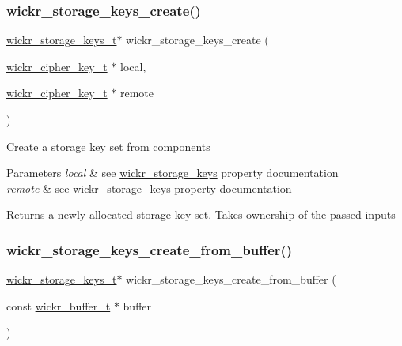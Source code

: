\subsubsection{\texorpdfstring{wickr\+\_\+storage\+\_\+keys\+\_\+create()}{wickr\_storage\_keys\_create()}}
{\footnotesize\ttfamily \hyperlink{structwickr__storage__keys}{wickr\+\_\+storage\+\_\+keys\+\_\+t}$\ast$ wickr\+\_\+storage\+\_\+keys\+\_\+create (\begin{DoxyParamCaption}\item[{\hyperlink{structwickr__cipher__key}{wickr\+\_\+cipher\+\_\+key\+\_\+t} $\ast$}]{local,  }\item[{\hyperlink{structwickr__cipher__key}{wickr\+\_\+cipher\+\_\+key\+\_\+t} $\ast$}]{remote }\end{DoxyParamCaption})}

Create a storage key set from components


\begin{DoxyParams}{Parameters}
{\em local} & see \textquotesingle{}\hyperlink{structwickr__storage__keys}{wickr\+\_\+storage\+\_\+keys}\textquotesingle{} property documentation \\
\hline
{\em remote} & see \textquotesingle{}\hyperlink{structwickr__storage__keys}{wickr\+\_\+storage\+\_\+keys}\textquotesingle{} property documentation \\
\hline
\end{DoxyParams}
\begin{DoxyReturn}{Returns}
a newly allocated storage key set. Takes ownership of the passed inputs 
\end{DoxyReturn}
\mbox{\label{group__wickr__storage__keys_gae5631d93182e635fb7f48269eb3f1723}} 
\subsubsection{\texorpdfstring{wickr\+\_\+storage\+\_\+keys\+\_\+create\+\_\+from\+\_\+buffer()}{wickr\_storage\_keys\_create\_from\_buffer()}}
{\footnotesize\ttfamily \hyperlink{structwickr__storage__keys}{wickr\+\_\+storage\+\_\+keys\+\_\+t}$\ast$ wickr\+\_\+storage\+\_\+keys\+\_\+create\+\_\+from\+\_\+buffer (\begin{DoxyParamCaption}\item[{const \hyperlink{structwickr__buffer}{wickr\+\_\+buffer\+\_\+t} $\ast$}]{buffer }\end{DoxyParamCaption})}

